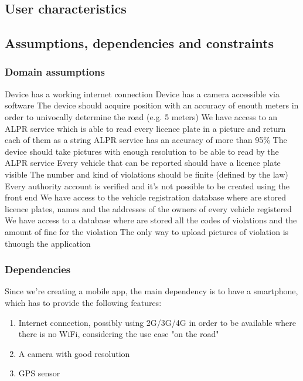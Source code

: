 \subsection{User characteristics}

\subsection{Assumptions, dependencies and constraints}
\subsubsection{Domain assumptions}

\begin{enumerate}
 Device has a working internet connection
 Device has a camera accessible via software
 The device should acquire position with an accuracy of enouth meters in order to univocally determine the road (e.g. 5 meters)
 We have access to an ALPR service which is able to read every licence plate in a picture and return each of them as a string
 ALPR service has an accuracy of more than 95\%
 The device should take pictures with enough resolution to be able to read by the ALPR service
 Every vehicle that can be reported should have a licence plate visible
 The number and kind of violations should be finite (defined by the law)
 Every authority account is verified and it's not possible to be created using the front end
 We have access to the vehicle registration database where are stored licence plates, names and the addresses of the owners of every vehicle registered
 We have access to a database where are stored all the codes of violations and the amount of fine for the violation
 The only way to upload pictures of violation is thuough the application

\end{enumerate}

\subsubsection{Dependencies} \label{Dependencies}
Since we're creating a mobile app, the main dependency is to have a smartphone, which has to provide the following features:
\begin{enumerate}
  \item Internet connection, possibly using 2G/3G/4G in order to be available where there is no WiFi, considering the use case "on the road"
  \item A camera with good resolution
  \item GPS sensor
\end{enumerate}

